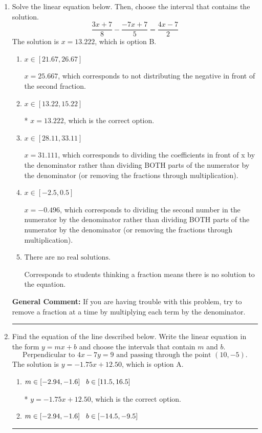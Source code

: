 \documentclass{extbook}[14pt]
\newcommand{\litem}[1]{\item #1

\rule{\textwidth}{0.4pt}}
\begin{document}
\begin{enumerate}\litem{
Solve the linear equation below. Then, choose the interval that contains the solution.
\[ \frac{3x + 7}{8} - \frac{-7x + 7}{5} = \frac{4x -7}{2} \]The solution is \( x = 13.222 \), which is option B.\begin{enumerate}[label=\Alph*.]
\item \( x \in [21.67, 26.67] \)

 $x = 25.667$, which corresponds to not distributing the negative in front of the second fraction.
\item \( x \in [13.22, 15.22] \)

* $x = 13.222$, which is the correct option.
\item \( x \in [28.11, 33.11] \)

 $x = 31.111$, which corresponds to dividing the coefficients in front of x by the denominator rather than dividing BOTH parts of the numerator by the denominator (or removing the fractions through multiplication).
\item \( x \in [-2.5, 0.5] \)

 $x = -0.496$, which corresponds to dividing the second number in the numerator by the denominator rather than dividing BOTH parts of the numerator by the denominator (or removing the fractions through multiplication).
\item \( \text{There are no real solutions.} \)

Corresponds to students thinking a fraction means there is no solution to the equation.
\end{enumerate}

\textbf{General Comment:} If you are having trouble with this problem, try to remove a fraction at a time by multiplying each term by the denominator.
}
\litem{
Find the equation of the line described below. Write the linear equation in the form $ y=mx+b $ and choose the intervals that contain $m$ and $b$.
\[ \text{Perpendicular to } 4 x - 7 y = 9 \text{ and passing through the point } (10, -5). \]The solution is \( y = -1.75x + 12.50 \), which is option A.\begin{enumerate}[label=\Alph*.]
\item \( m \in [-2.94, -1.6] \hspace*{3mm} b \in [11.5, 16.5] \)

* $y = -1.75x + 12.50$, which is the correct option.
\item \( m \in [-2.94, -1.6] \hspace*{3mm} b \in [-14.5, -9.5] \)


\end{enumerate}}
\end{enumerate}
\end{document}
